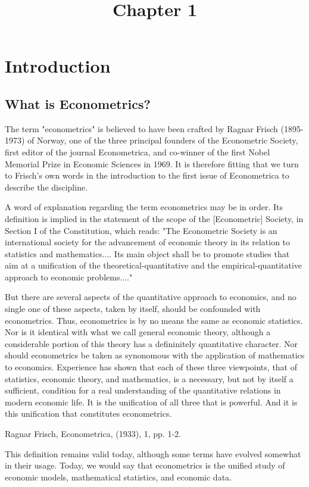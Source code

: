 \documentclass[10pt]{article}
\title{Chapter 1 }
\author{}
\date{}
\begin{document}
\maketitle
\section{Introduction}
\subsection{What is Econometrics?}
The term "econometrics" is believed to have been crafted by Ragnar Frisch (1895-1973) of Norway, one of the three principal founders of the Econometric Society, first editor of the journal Econometrica, and co-winner of the first Nobel Memorial Prize in Economic Sciences in 1969. It is therefore fitting that we turn to Frisch's own words in the introduction to the first issue of Econometrica to describe the discipline.

A word of explanation regarding the term econometrics may be in order. Its definition is implied in the statement of the scope of the [Econometric] Society, in Section I of the Constitution, which reads: "The Econometric Society is an international society for the advancement of economic theory in its relation to statistics and mathematics.... Its main object shall be to promote studies that aim at a unification of the theoretical-quantitative and the empirical-quantitative approach to economic problems...."

But there are several aspects of the quantitative approach to economics, and no single one of these aspects, taken by itself, should be confounded with econometrics. Thus, econometrics is by no means the same as economic statistics. Nor is it identical with what we call general economic theory, although a considerable portion of this theory has a defininitely quantitative character. Nor should econometrics be taken as synonomous with the application of mathematics to economics. Experience has shown that each of these three viewpoints, that of statistics, economic theory, and mathematics, is a necessary, but not by itself a sufficient, condition for a real understanding of the quantitative relations in modern economic life. It is the unification of all three that is powerful. And it is this unification that constitutes econometrics.

Ragnar Frisch, Econometrica, (1933), 1, pp. 1-2.

This definition remains valid today, although some terms have evolved somewhat in their usage. Today, we would say that econometrics is the unified study of economic models, mathematical statistics, and economic data.
\end{document}
